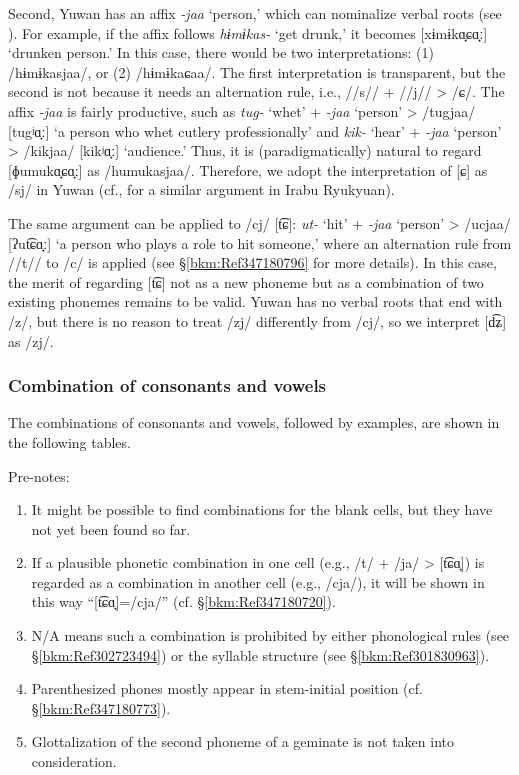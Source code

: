 Second, Yuwan has an affix \textit{{}-jaa} ‘person,’ which can nominalize verbal roots (see ). For example, if the affix follows \textit{hɨmɨkas-} ‘get drunk,’ it becomes [xɨmɨkɑ̟ɕɑ̟ː] ‘drunken person.’ In this case, there would be two interpretations: (1) /hɨmɨkasjaa/, or (2) /hɨmɨkaɕaa/. The first interpretation is transparent, but the second is not because it needs an alternation rule, i.e., //s// + //j// > /ɕ/. The affix \textit{{}-jaa} is fairly productive, such as \textit{tug-} ‘whet’ + \textit{{}-jaa} ‘person’ > /tugjaa/ [tugʲɑ̟ː] ‘a person who whet cutlery professionally’ and \textit{kik-} ‘hear’ + \textit{{}-jaa} ‘person’ > /kikjaa/ [kikʲɑ̟ː] ‘audience.’ Thus, it is (paradigmatically) natural to regard [ɸumukɑ̟ɕɑ̟ː] as /humukasjaa/. Therefore, we adopt the interpretation of [ɕ] as /sj/ in Yuwan (cf., \citet[79-81]{Shimoji2008} for a similar argument in Irabu Ryukyuan).

The same argument can be applied to /cj/ [t͡ɕ]: \textit{ut-} ‘hit’ + \textit{{}-jaa} ‘person’ > /ucjaa/ [ʔut͡ɕɑ̟ː] ‘a person who plays a role to hit someone,’ where an alternation rule from //t// to /c/ is applied (see §\ref{bkm:Ref347180796} for more details). In this case, the merit of regarding [t͡ɕ] not as a new phoneme but as a combination of two existing phonemes remains to be valid. Yuwan has no verbal roots that end with /z/, but there is no reason to treat /zj/ differently from /cj/, so we interpret [d͡ʑ] as /zj/.

\subsubsection{Combination of consonants and vowels}
\hypertarget{RefHeadingToc395696976}{}\label{bkm:Ref347177989}\label{bkm:Ref347180694}\label{bkm:Ref347181003}
The combinations of consonants and vowels, followed by examples, are shown in the following tables.

Pre-notes: 

\begin{enumerate}[label=\alph*.]
\item It might be possible to find combinations for the blank cells, but they have not yet been found so far.
\item If a plausible phonetic combination in one cell (e.g., /t/ + /ja/ > [t͡ɕɑ̟]) is regarded as a combination in another cell (e.g., /cja/), it will be shown in this way “[t͡ɕɑ̟]=/cja/” (cf. §\ref{bkm:Ref347180720}).
\item N/A means such a combination is prohibited by either phonological rules (see §\ref{bkm:Ref302723494}) or the syllable structure (see §\ref{bkm:Ref301830963}).
\item Parenthesized phones mostly appear in stem-initial position (cf. §\ref{bkm:Ref347180773}).
\item Glottalization of the second phoneme of a geminate is not taken into consideration.
\end{enumerate}

